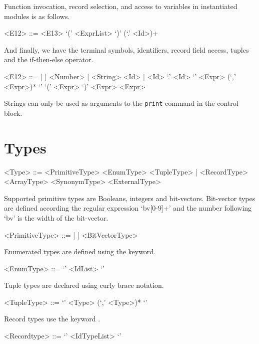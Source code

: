 Function invocation, record selection, and access to variables in instantiated modules is as follows.
\begin{grammar}
    <E12> ::=  <E13> `(' <ExprList> `)'
           (`.' <Id>)+
\end{grammar}

And finally, we have the terminal symbols, identifiers, record field access, tuples and the if-then-else operator.
\begin{grammar}
    <E12> ::=  |  | <Number> | <String>
          \alt <Id> | <Id> `.' <Id>
          \alt `{' <Expr> (`,' <Expr>)* `}'
          \alt {} `(' <Expr> `)'  <Expr>  <Expr>
\end{grammar}

Strings can only be used as arguments to the \texttt{print} command in the control block.

\section{Types}

\begin{grammar}
<Type> ::= <PrimitiveType> 
       \alt <EnumType> 
       \alt <TupleType> | <RecordType> 
       \alt <ArrayType> 
       \alt <SynonymType> 
       \alt <ExternalType> 
\end{grammar}

Supported primitive types are Booleans, integers and bit-vectors. Bit-vector types are defined according the regular expression `bv[0-9]+' and the number following `bv' is the width of the bit-vector.

\begin{grammar}
    <PrimitiveType> ::=  |  | <BitVectorType>
\end{grammar}

Enumerated types are defined using the  keyword.
\begin{grammar}
    <EnumType> ::=  `{' <IdList> `}'
\end{grammar}

Tuple types are declared using curly brace notation.
\begin{grammar}
    <TupleType> ::= `{' <Type>  (`,' <Type>)* `}'
\end{grammar}

Record types use the keyword .
\begin{grammar}
    <Recordtype> ::=  `{' <IdTypeList> `}'
\end{grammar}

